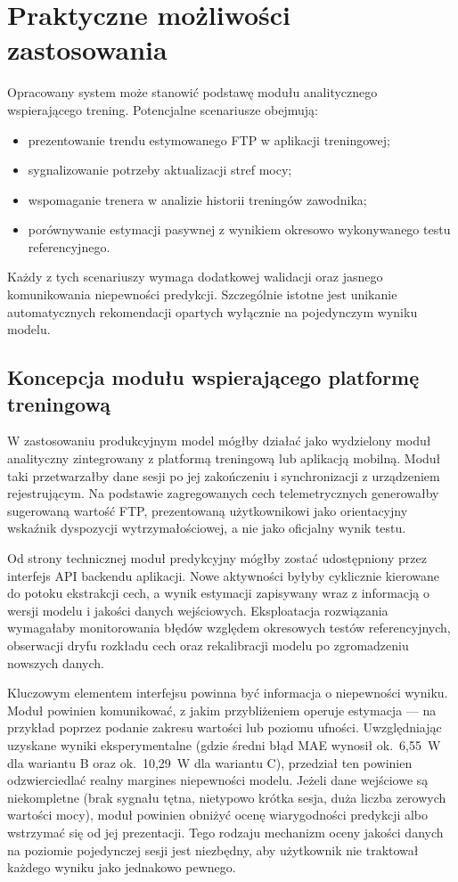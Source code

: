 \section{Praktyczne możliwości zastosowania}

Opracowany system może stanowić podstawę modułu analitycznego wspierającego trening. Potencjalne scenariusze obejmują:
\begin{itemize}
    \item prezentowanie trendu estymowanego FTP w aplikacji treningowej;
    \item sygnalizowanie potrzeby aktualizacji stref mocy;
    \item wspomaganie trenera w analizie historii treningów zawodnika;
    \item porównywanie estymacji pasywnej z wynikiem okresowo wykonywanego testu referencyjnego.
\end{itemize}

Każdy z tych scenariuszy wymaga dodatkowej walidacji oraz jasnego komunikowania niepewności predykcji. Szczególnie istotne jest unikanie automatycznych rekomendacji opartych wyłącznie na pojedynczym wyniku modelu.

\subsection{Koncepcja modułu wspierającego platformę treningową}

W zastosowaniu produkcyjnym model mógłby działać jako wydzielony moduł analityczny zintegrowany z platformą treningową lub aplikacją mobilną. Moduł taki przetwarzałby dane sesji po jej zakończeniu i synchronizacji z urządzeniem rejestrującym. Na podstawie zagregowanych cech telemetrycznych generowałby sugerowaną wartość FTP, prezentowaną użytkownikowi jako orientacyjny wskaźnik dyspozycji wytrzymałościowej, a nie jako oficjalny wynik testu.

Od strony technicznej moduł predykcyjny mógłby zostać udostępniony przez interfejs API backendu aplikacji. Nowe aktywności byłyby cyklicznie kierowane do potoku ekstrakcji cech, a wynik estymacji zapisywany wraz z informacją o wersji modelu i jakości danych wejściowych. Eksploatacja rozwiązania wymagałaby monitorowania błędów względem okresowych testów referencyjnych, obserwacji dryfu rozkładu cech oraz rekalibracji modelu po zgromadzeniu nowszych danych.

Kluczowym elementem interfejsu powinna być informacja o niepewności wyniku. Moduł powinien komunikować, z jakim przybliżeniem operuje estymacja --- na przykład poprzez podanie zakresu wartości lub poziomu ufności. Uwzględniając uzyskane wyniki eksperymentalne (gdzie średni błąd MAE wynosił ok.\ 6,55~W dla wariantu B oraz ok.\ 10,29~W dla wariantu C), przedział ten powinien odzwierciedlać realny margines niepewności modelu. Jeżeli dane wejściowe są niekompletne (brak sygnału tętna, nietypowo krótka sesja, duża liczba zerowych wartości mocy), moduł powinien obniżyć ocenę wiarygodności predykcji albo wstrzymać się od jej prezentacji. Tego rodzaju mechanizm oceny jakości danych na poziomie pojedynczej sesji jest niezbędny, aby użytkownik nie traktował każdego wyniku jako jednakowo pewnego.

